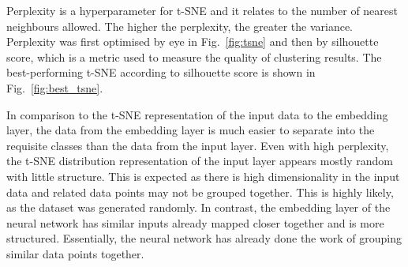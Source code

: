 \documentclass[11pt,a4paper]{article}
\begin{document}
Perplexity is a hyperparameter for t-SNE and it relates to the number of nearest neighbours allowed. The higher the perplexity, the greater the variance. Perplexity was first optimised by eye in Fig.~\ref{fig:tsne} and then by silhouette score, which is a metric used to measure the quality of clustering results. The best-performing t-SNE according to silhouette score is shown in Fig.~\ref{fig:best_tsne}.

In comparison to the t-SNE representation of the input data to the embedding layer, the data from the embedding layer is much easier to separate into the requisite classes than the data from the input layer. Even with high perplexity, the t-SNE distribution representation of the input layer appears mostly random with little structure. This is expected as there is high dimensionality in the input data and related data points may not be grouped together. This is highly likely, as the dataset was generated randomly. In contrast, the embedding layer of the neural network has similar inputs already mapped closer together and is more structured. Essentially, the neural network has already done the work of grouping similar data points together.
\end{document}
